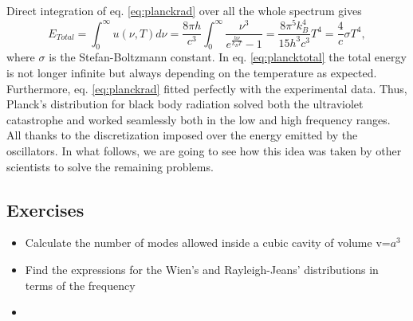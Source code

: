 \documentclass{article}
\begin{document}
Direct integration of eq. \ref{eq:planckrad} over all the whole spectrum gives
\begin{equation}\label{eq:plancktotal}
  E_{Total} = \int_{0}^{\infty}u(\nu,T)d\nu = \frac{8\pi h}{c^3} \int_0 ^{\infty} \frac{\nu^3}{e^{\frac{h\nu}{k_B T}}-1}=\frac{8\pi^5k_B ^4}{15h^3 c^3}T^4=\frac{4}{c}\sigma T^4,
\end{equation}
where $\sigma$ is the Stefan-Boltzmann constant. In eq. \ref{eq:plancktotal} the total energy is not longer infinite but always depending on the temperature as expected. Furthermore, eq. \ref{eq:planckrad} fitted perfectly with the experimental data. Thus, Planck's distribution for black body radiation solved both the ultraviolet catastrophe and worked seamlessly both in the low and high frequency ranges. All thanks to the discretization imposed over the energy emitted by the oscillators. 
In what follows, we are going to see how this idea was taken by other scientists to solve the remaining problems.
\subsection{Exercises}
\begin{itemize}
  \item Calculate the number of modes allowed inside a cubic cavity of volume v=$a^3$ 
  \item Find the expressions for the Wien's and Rayleigh-Jeans' distributions in terms of the frequency
  \item 
\end{itemize}
\end{document}
